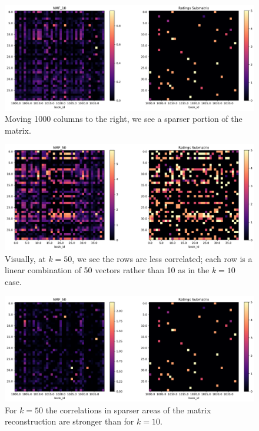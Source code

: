 \documentclass[11pt]{article}
\begin{document}
\begin{figure}[p]
    \centering
    \includegraphics[width=\linewidth]{../image/goodreads-models/nmf-10-left-center-close.png}
    \caption[NMF-10-Left-Center-Close]{Moving 1000 columns to the right, we see a sparser portion of the matrix.}
     \label{fig:nmf-10-left}
\end{figure}


\begin{figure}[p]
    \centering
    \includegraphics[width=\linewidth]{../image/goodreads-models/nmf-50-left-close.png}
    \caption[NMF-50-Left-Close]{Visually, at $k=50$, we see the rows are less correlated;
    each row is a linear combination of 50 vectors rather than 10 as in the $k=10$ case.}
     \label{fig:nmf-50-left-close}
\end{figure}



\begin{figure}[p]
    \centering
    \includegraphics[width=\linewidth]{../image/goodreads-models/nmf-50-left-center-close.png}
    \caption[NMF-50-Left-Center-Close]{For $k=50$ the correlations in sparser areas of the 
    matrix reconstruction are stronger than for $k=10$.}
     \label{fig:nmf-50-left-center-close}
\end{figure}
\end{document}
